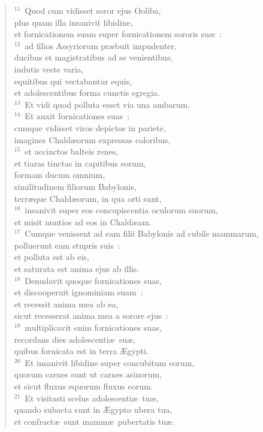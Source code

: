 \begin{verse}
${}^{11}$~Quod cum vidisset soror ejus Ooliba,\\ plus quam illa insanivit libidine,\\ et fornicationem suam super fornicationem sororis su\ae~:\\
${}^{12}$~ad filios Assyriorum pr\ae buit impudenter,\\ ducibus et magistratibus ad se venientibus,\\ indutis veste varia,\\ equitibus qui vectabantur equis,\\ et adolescentibus forma cunctis egregia.\\
${}^{13}$~Et vidi quod polluta esset via una ambarum.\\
${}^{14}$~Et auxit fornicationes suas~:\\ cumque vidisset viros depictos in pariete,\\ imagines Chald\ae orum expressas coloribus,\\
${}^{15}$~et accinctos balteis renes,\\ et tiaras tinctas in capitibus eorum,\\ formam ducum omnium,\\ similitudinem filiorum Babylonis,\\ terr\ae que Chald\ae orum, in qua orti sunt,\\
${}^{16}$~insanivit super eos concupiscentia oculorum suorum,\\ et misit nuntios ad eos in Chald\ae am.\\
${}^{17}$~Cumque venissent ad eam filii Babylonis ad cubile mammarum,\\ polluerunt eam stupris suis~:\\ et polluta est ab eis,\\ et saturata est anima ejus ab illis.\\
${}^{18}$~Denudavit quoque fornicationes suas,\\ et discooperuit ignominiam suam~:\\ et recessit anima mea ab ea,\\ sicut recesserat anima mea a sorore ejus~:\\
${}^{19}$~multiplicavit enim fornicationes suas,\\ recordans dies adolescenti\ae\ su\ae ,\\ quibus fornicata est in terra \AE gypti.\\
${}^{20}$~Et insanivit libidine super concubitum eorum,\\ quorum carnes sunt ut carnes asinorum,\\ et sicut fluxus equorum fluxus eorum.\\
${}^{21}$~Et visitasti scelus adolescenti\ae\ tu\ae ,\\ quando subacta sunt in \AE gypto ubera tua,\\ et confract\ae\ sunt mamm\ae\ pubertatis tu\ae .\end{verse}


